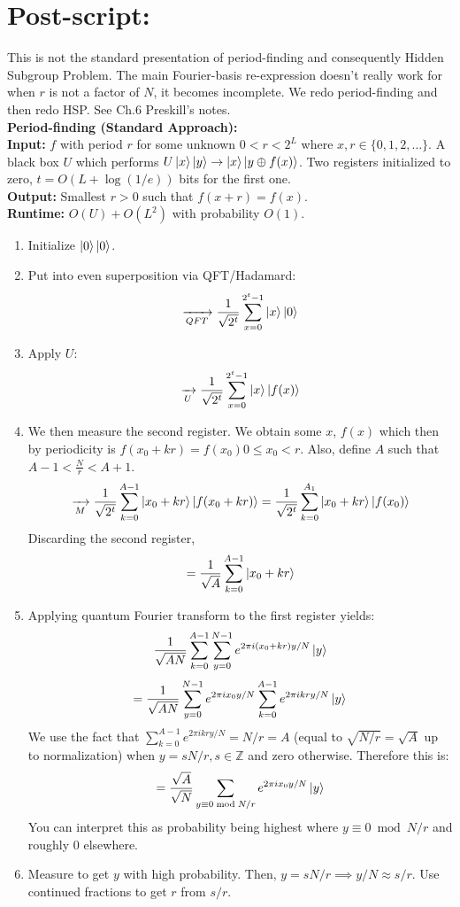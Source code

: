 \documentclass{article}
\begin{document}
\section{Post-script:}
This is not the standard presentation of period-finding and consequently Hidden Subgroup Problem. The main Fourier-basis re-expression doesn't really work for when $r$ is not a factor of $N$, it becomes incomplete. We redo period-finding and then redo HSP. See Ch.6 Preskill's notes.\\
\textbf{Period-finding (Standard Approach):}\\
	\textbf{Input:} $f$ with period $r$ for some unknown $0 < r < 2^L$ where $x,r \in \{ 0,1,2, \dots\}$. A black box $U$ which performs $U\ket{x}\ket{y} \to \ket{x} \ket{y \oplus f(x)}$. Two registers initialized to zero, $t = O(L + \log(1/e))$ bits for the first one.\\
	\textbf{Output:} Smallest $r>0$ such that $f(x+r) = f(x)$.\\
	\textbf{Runtime:} $O(U) + O(L^2)$ with probability $O(1)$.
\begin{enumerate}
	\item Initialize $\ket{0}\ket{0}$.
	\item Put into even superposition via QFT/Hadamard:
		$$ \xrightarrow[QFT]{} \frac{1}{\sqrt{2^t}} \sum_{x=0}^{2^t-1}\ket{x}\ket{0}$$
	\item Apply $U$: 
		$$\xrightarrow[U]{} \frac{1}{\sqrt{2^t}} \sum_{x=0}^{2^t-1} \ket{x}\ket{f(x)}$$
\item We then measure the second register. We obtain some $x$, $f(x)$ which then by periodicity is $f(x_0 + kr) = f(x_0) 0 \leq x_0 < r$. Also, define $A$ such that $A - 1 < \frac{N}{r} < A+1$.
		$$\xrightarrow[M]{} \frac{1}{\sqrt{2^t}}\sum_{k = 0}^{A-1}\ket{x_0 + kr} \ket{f(x_0 + kr)} = \frac{1}{\sqrt{2^t}} \sum_{k=0}^{A_1} \ket{x_0 + kr}\ket{f(x_0)}$$
	Discarding the second register,
	$$ = \frac{1}{\sqrt{A}}\sum_{k=0}^{A-1}\ket{x_0 + kr}$$
	\item Applying quantum Fourier transform to the first register yields:
		$$\frac{1}{\sqrt{AN}} \sum_{k=0}^{A-1}\sum_{y=0}^{N-1} e^{2\pi i(x_0 + kr)y/N} \ket{y}$$
		$$=\frac{1}{\sqrt{AN}} \sum_{y=0}^{N-1} e^{2\pi i x_0 y/ N}\sum_{k=0}^{A-1} e^{2\pi i kr y/ N} \ket{y}$$
		We use the fact that $\sum_{k=0}^{A-1} e^{2\pi i kry/N} = N/r = A$ (equal to $\sqrt{N/r} =\sqrt{A}$ up to normalization) when $y= sN/r, s\in \mathbb{Z}$ and zero otherwise. Therefore this is:
		$$=\frac{\sqrt{A}}{\sqrt{N}} \sum_{y \equiv 0 \bmod N/r} e^{2\pi i x_0 y/N}\ket{y}$$
			You can interpret this as probability being highest where $y\equiv 0 \bmod N/r$ and roughly 0 elsewhere.
		\item Measure to get $y$ with high probability. Then, $y= sN/r \implies y/N \approx s/r$. Use continued fractions to get $r$ from $s/r$.
\end{enumerate}
\end{document}
